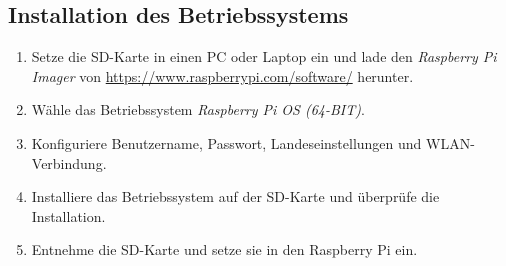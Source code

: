 \documentclass[a4paper,12pt]{article}
\begin{document}
\subsection{Installation des Betriebssystems}
\begin{enumerate}
    \item Setze die SD-Karte in einen PC oder Laptop ein und lade den \textit{Raspberry Pi Imager} von \url{https://www.raspberrypi.com/software/} herunter.
    \item Wähle das Betriebssystem \textit{Raspberry Pi OS (64-BIT)}.
    \item Konfiguriere Benutzername, Passwort, Landeseinstellungen und WLAN-Verbindung.
    \item Installiere das Betriebssystem auf der SD-Karte und überprüfe die Installation.
    \item Entnehme die SD-Karte und setze sie in den Raspberry Pi ein.
\end{enumerate}
\end{document}
